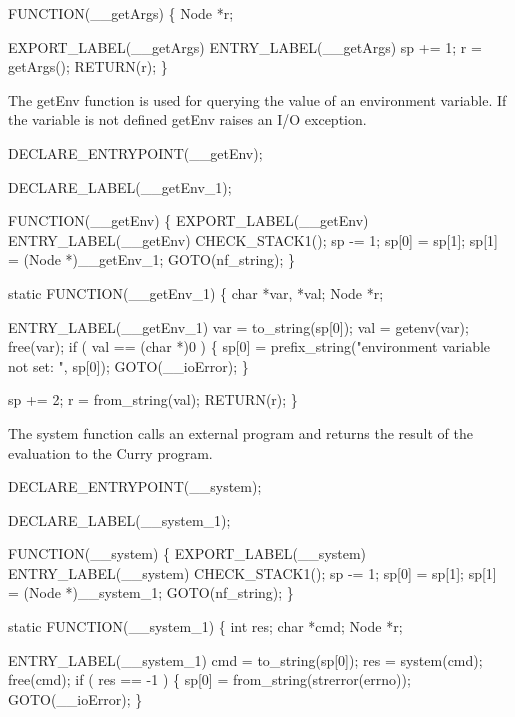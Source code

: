 FUNCTION(__getArgs)
\{
    Node *r;

    EXPORT_LABEL(__getArgs)
 ENTRY_LABEL(__getArgs)
    sp += 1;
    r   = getArgs();
    RETURN(r);
\}

\nwendcode{}\nwdocspar
The {\Tt{}getEnv\nwendquote} function is used for querying the value of an
environment variable. If the variable is not defined {\Tt{}getEnv\nwendquote} raises
an I/O exception.

\nwenddocs{}\plusendmoddef\nwstartdeflinemarkup{}\nwenddeflinemarkup
DECLARE_ENTRYPOINT(__getEnv);

DECLARE_LABEL(__getEnv_1);

FUNCTION(__getEnv)
\{
    EXPORT_LABEL(__getEnv)
 ENTRY_LABEL(__getEnv)
    CHECK_STACK1();
    sp   -= 1;
    sp[0] = sp[1];
    sp[1] = (Node *)__getEnv_1;
    GOTO(nf_string);
\}

static
FUNCTION(__getEnv_1)
\{
    char *var, *val;
    Node *r;

 ENTRY_LABEL(__getEnv_1)
    var = to_string(sp[0]);
    val = getenv(var);
    free(var);
    if ( val == (char *)0 )
    \{
        sp[0] = prefix_string("environment variable not set: ", sp[0]);
        GOTO(__ioError);
    \}

    sp += 2;
    r   = from_string(val);
    RETURN(r);
\}

\nwendcode{}\nwdocspar
The {\Tt{}system\nwendquote} function calls an external program and returns the
result of the evaluation to the Curry program.

\nwenddocs{}\plusendmoddef\nwstartdeflinemarkup{}\nwenddeflinemarkup
DECLARE_ENTRYPOINT(__system);

DECLARE_LABEL(__system_1);

FUNCTION(__system)
\{
    EXPORT_LABEL(__system)
 ENTRY_LABEL(__system)
    CHECK_STACK1();
    sp -= 1;
    sp[0] = sp[1];
    sp[1] = (Node *)__system_1;
    GOTO(nf_string);
\}

static
FUNCTION(__system_1)
\{
    int  res;
    char *cmd;
    Node *r;

 ENTRY_LABEL(__system_1)
    cmd = to_string(sp[0]);
    res = system(cmd);
    free(cmd);
    if ( res == -1 )
    \{
        sp[0] = from_string(strerror(errno));
        GOTO(__ioError);
    \}
    
